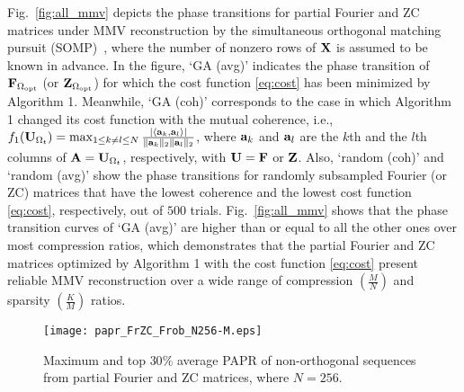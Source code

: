 \documentclass[journal]{IEEEtran}
\newcommand{\abu}{{\bf a}}
\newcommand{\vbu}{{\bf v}}
\newcommand{\Abu}{{\bf A}}
\newcommand{\Fbu}{{\bf F}}
\newcommand{\Ubu}{{\bf U}}
\newcommand{\Xbu}{{\bf X}}
\newcommand{\Zbu}{{\bf Z}}
\numberwithin{const2}{const}
\begin{document}
Fig.~\ref{fig:all_mmv} depicts the phase transitions
for partial Fourier and ZC matrices 
under MMV reconstruction by
the simultaneous orthogonal matching pursuit (SOMP)~\cite{Tropp:somp}, where 
the number of nonzero rows of $\Xbu$ is assumed to be known in advance.
In the figure, 
`GA (avg)' indicates the phase transition of $\Fbu_{\Omega_{\rm opt}}$ (or $\Zbu_{\Omega_{\rm opt}}$)
for which the cost function \eqref{eq:cost} has been minimized by Algorithm 1.
Meanwhile, `GA (coh)' corresponds to the case in which Algorithm 1 %
changed its cost function with the mutual coherence, %
i.e., $f_1(\Ubu_{\Omega_t}) %
= \max_{ 1 \leq k \neq l \leq N  }
\frac{\left| \left \langle \abu_{k} ,  \abu_{l}  \right \rangle \right| }
{\| \abu_{k} \|_2 \| \abu_{l} \|_2}$, 
where $\abu_k$ and $\abu_l$ are the $k$th and the $l$th columns of $\Abu = \Ubu_{\Omega_t}$, respectively,
with $\Ubu = \Fbu$ or $\Zbu$.
Also, `random (coh)' and `random (avg)' show the phase transitions for
randomly subsampled Fourier (or ZC) matrices that %
have the lowest coherence and the lowest cost function \eqref{eq:cost}, respectively,
out of $500$ trials.
Fig.~\ref{fig:all_mmv} shows that %
the phase transition curves of `GA (avg)'
are higher than or equal to all the other ones over most compression ratios,
which demonstrates that the partial Fourier and ZC matrices optimized by Algorithm 1 
with the cost function \eqref{eq:cost}
present reliable MMV reconstruction %
over a wide range of compression $\left( \frac{M}{N} \right)$ and sparsity $\left( \frac{K}{M} \right)$ ratios.



\begin{figure}[!t]
	\centering
	\texttt{[image: papr\_FrZC\_Frob\_N256-M.eps]}
	\caption{Maximum and top $30 \%$ average 
		PAPR of non-orthogonal sequences from partial Fourier and %
		ZC matrices, %
		where $N=256$.}
	\label{fig:all_papr}
\end{figure}
\end{document}
